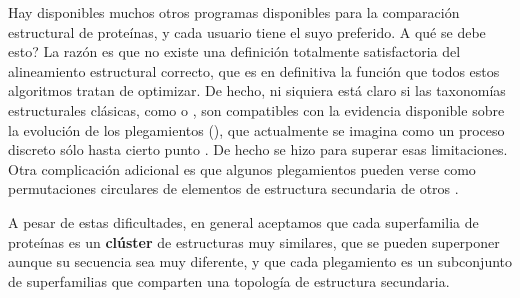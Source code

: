 Hay disponibles muchos otros programas disponibles para la comparaci\'{o}n estructural de prote\'{i}nas, 
y cada usuario tiene el suyo preferido. A qu\'{e} se debe esto? 
La raz\'{o}n es que no existe una definici\'{o}n totalmente satisfactoria del alineamiento estructural correcto, 
que es en definitiva la funci\'{o}n que todos estos algoritmos tratan de optimizar. De hecho, ni siquiera
est\'{a} claro si las taxonom\'{i}as estructurales cl\'{a}sicas, 
como  o
 \citep{Csaba2009},
son compatibles con la evidencia disponible sobre la evoluci\'{o}n de los plegamientos (), que
actualmente se imagina como un proceso discreto s\'{o}lo hasta cierto punto \citep{Taylor2002,Pascual2009,Sadowski2010,Andreeva2014}. 
De hecho  se hizo para superar esas limitaciones.
Otra complicaci\'{o}n adicional es que algunos plegamientos pueden verse como permutaciones circulares de elementos de estructura 
secundaria de otros \citep{Schmidt-Goenner2010}.

A pesar de estas dificultades, en general aceptamos que cada superfamilia de prote\'{i}nas es un \textbf{cl\'{u}ster}
de estructuras muy similares, que se pueden superponer aunque su secuencia sea muy diferente, 
y que cada plegamiento es un subconjunto de superfamilias que comparten una topolog\'{i}a de estructura secundaria.

